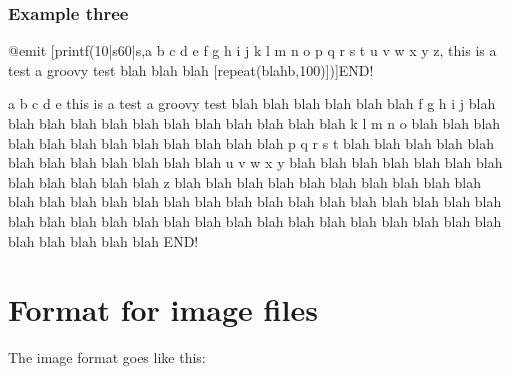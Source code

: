 \documentclass[letterpaper,10pt,english]{sphinxmanual}
\begin{document}
\subsection{Example three}
\label{\detokenize{advanced:example-three}}
\begin{sphinxVerbatim}[commandchars=\\\{\}]
@emit [printf(\PYGZdl{}\PYGZhy{}10|\PYGZdq{}\PYGZsq{}s\PYGZdl{}\PYGZhy{}60|\PYGZdq{}s,a b c d e f g h i j k l m n o p q r s t u v w x y z,
this is a test a groovy test blah blah blah [repeat(blah\PYGZpc{}b,100)])]END!

a b c d e this is a test a groovy test blah blah blah blah blah blah
f g h i j blah blah blah blah blah blah blah blah blah blah blah blah
k l m n o blah blah blah blah blah blah blah blah blah blah blah blah
p q r s t blah blah blah blah blah blah blah blah blah blah blah blah
u v w x y blah blah blah blah blah blah blah blah blah blah blah blah
z         blah blah blah blah blah blah blah blah blah blah blah blah
blah blah blah blah blah blah blah blah blah blah blah blah blah blah
blah blah blah blah blah blah blah blah blah blah blah blah blah blah
blah blah blah blah blah blah blah                                    END!
\end{sphinxVerbatim}


\chapter{Format for image files}
\label{\detokenize{advanced:format-for-image-files}}
\sphinxAtStartPar
The image format goes like this:
\end{document}
